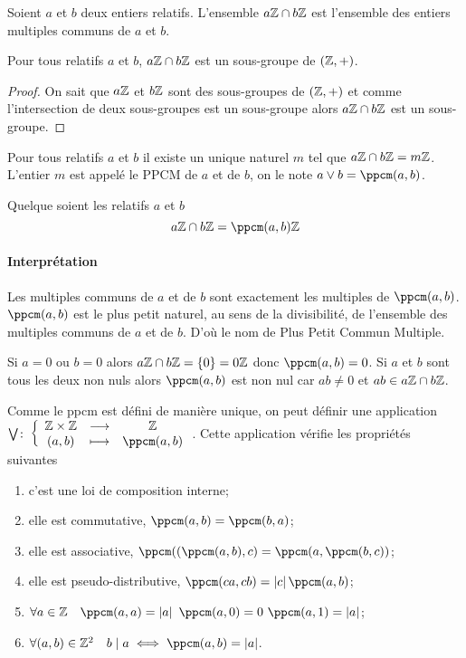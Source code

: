 Soient $a$ et $b$ deux entiers relatifs. L'ensemble $a\mathbb{Z} \cap b\mathbb{Z}$ est l'ensemble des entiers multiples communs de $a$ et $b$.
\begin{theo}
  Pour tous relatifs $a$ et $b$, $a\mathbb{Z} \cap b\mathbb{Z}$ est un sous-groupe de $(\mathbb{Z},+)$.
\end{theo}
\begin{proof}
  On sait que $a\mathbb{Z}$ et $b\mathbb{Z}$ sont des sous-groupes de $(\mathbb{Z},+)$ et comme l'intersection de deux sous-groupes est un sous-groupe alors $a\mathbb{Z} \cap b\mathbb{Z}$ est un sous-groupe.
\end{proof}
\begin{corth}
  Pour tous relatifs $a$ et $b$ il existe un unique naturel $m$ tel que $a\mathbb{Z} \cap b\mathbb{Z}= m \mathbb{Z}$. L'entier $m$ est appelé le PPCM de $a$ et de $b$, on le note $a \vee b = \ppcm(a,b)$.
\end{corth}
\begin{theo}
  Quelque soient les relatifs $a$ et $b$
  \begin{equation}
    a\Z \cap b\Z = \ppcm(a,b) \Z
  \end{equation}
\end{theo}

\paragraph{Interprétation}

Les multiples communs de $a$ et de $b$ sont exactement les multiples de $\ppcm(a,b)$. $\ppcm(a,b)$ est le plus petit naturel, au sens de la divisibilité, de l'ensemble des multiples communs de $a$ et de $b$. D'où le nom de Plus Petit Commun Multiple.

Si $a=0$ ou $b=0$ alors $a\mathbb{Z} \cap b\mathbb{Z} = \{0\}=0\mathbb{Z}$ donc $\ppcm(a,b)=0$. Si $a$ et $b$ sont tous les deux non nuls alors $\ppcm(a,b)$ est non nul car $ab \neq 0$ et $ab \in a\mathbb{Z} \cap b\mathbb{Z}$.

\begin{prop}
  Comme le ppcm est défini de manière unique, on peut définir une application $\fonction{\bigvee}{\Z\times\Z}{\Z}{(a,b)}{\ppcm(a,b)}$. Cette application vérifie les propriétés suivantes
  \begin{enumerate}
  \item c'est une loi de composition interne;
  \item elle est commutative, $\ppcm(a,b)=\ppcm(b,a)$;
  \item elle est associative, $\ppcm((\ppcm(a,b),c)=\ppcm(a,\ppcm(b,c))$;
  \item elle est pseudo-distributive, $\ppcm(ca,cb)=\abs{c}\ppcm(a,b)$;
  \item $\forall a \in \Z \quad \ppcm(a,a)=\abs{a} \ \ppcm(a,0) = 0 \ \ppcm(a,1)=\abs{a}$;
  \item $\forall (a,b) \in \Z^2 \quad b\mid a \iff \ppcm(a,b)=\abs{a}$.
  \end{enumerate}
\end{prop}

